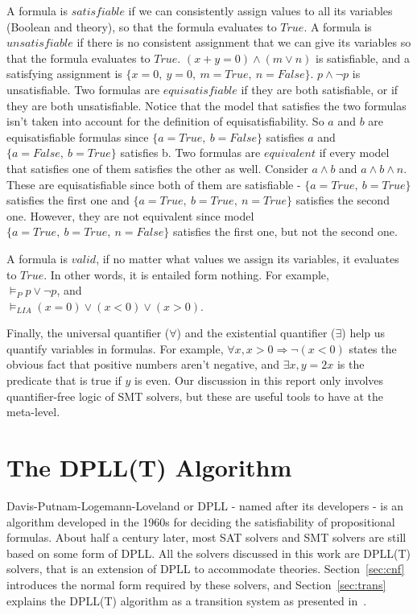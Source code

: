 \documentclass{article}
\begin{document}
A formula is $satisfiable$ if we can consistently assign
values to all its variables (Boolean and theory), 
so that the formula evaluates to $True$. A formula is 
$unsatisfiable$ if there is no consistent assignment that 
we can give its variables so that the formula evaluates to 
$True$. $(x + y = 0) \land (m \lor n)$ is satisfiable, 
and a satisfying assignment is $\{x = 0,\ y = 0,\ m = True,\ 
n = False\}$. $p \land \neg p$ is unsatisfiable. Two formulas 
are $equisatisfiable$ if they are both satisfiable, or if they 
are both unsatisfiable. Notice that the model that 
satisfies the two formulas isn't taken into account 
for the definition of equisatisfiability. So $a$ and $b$ are 
equisatisfiable formulas since $\{a = True,\ b = False\}$ 
satisfies $a$ and $\{a = False,\ b = True\}$ satisfies b. 
Two formulas are $equivalent$ if every model that satisfies 
one of them satisfies the other as well. Consider 
$a \land b$ and $a \land b \land n$. These are 
equisatisfiable since both of them are satisfiable - 
$\{a = True,\ b = True\}$ satisfies the first one and 
$\{a = True,\ b = True,\ n = True\}$ satisfies the second one.
However, they are not equivalent since model 
$\{a = True,\ b = True,\ n = False\}$ satisfies the first one, 
but not the second one.

A formula is $valid$, if no matter what values we assign its 
variables, it evaluates to $True$. In other words, it is
entailed form nothing. For example, \\
$\models_P p \lor \neg p$, and \\
$\models_{LIA} (x = 0) \lor (x < 0) \lor (x > 0)$.

Finally, the universal quantifier ($\forall$) and 
the existential quantifier ($\exists$) help us quantify 
variables in formulas. For example, $\forall x, x > 0 
\Rightarrow \neg (x < 0)$ states the obvious fact that 
positive numbers aren't negative, and $\exists x, y = 2x$ 
is the predicate that is true if $y$ is even. Our discussion 
in this report only involves quantifier-free logic of SMT 
solvers, but these are useful tools to have at the meta-level.


\section{The DPLL(T) Algorithm}
\label{sec:dpll}
Davis-Putnam-Logemann-Loveland or DPLL - named after its 
developers - is an algorithm developed in the 1960s 
for deciding the satisfiability of propositional formulas.
About half a century later, most SAT solvers and SMT solvers
are still based on some form of DPLL. All the solvers 
discussed in this work are DPLL(T) solvers, that is an 
extension of DPLL to accommodate theories. 
Section~\ref{sec:cnf}
introduces the normal form required by these solvers, 
and Section~\ref{sec:trans} explains the DPLL(T) algorithm as a 
transition system as presented 
in~\cite{DBLP:conf/fmcad/KatzBTRH16}.
\end{document}

